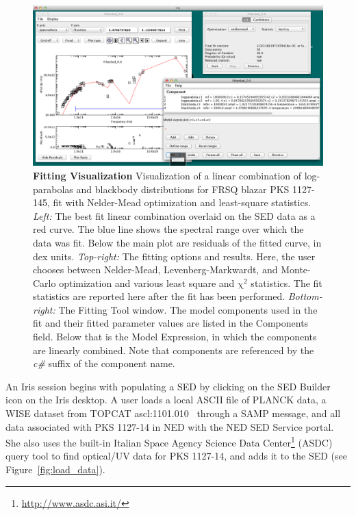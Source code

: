 \documentclass[final,5p,authoryear]{elsarticle}
\begin{document}
\begin{figure} \centering
\includegraphics[height=0.3\textheight]{figures/fitting-1.png}
\caption{\textbf{Fitting Visualization} Visualization of a linear combination of
log-parabolas and blackbody distributions for FRSQ blazar PKS 1127-145, fit with
Nelder-Mead optimization and least-square statistics. \textit{Left:} The best fit
linear combination overlaid on the SED data as a red curve. The blue line shows
the spectral range over which the data was fit. Below the main plot are
residuals of the fitted curve, in dex units. \textit{Top-right:} The fitting
options and results. Here, the user chooses between Nelder-Mead,
Levenberg-Markwardt, and Monte-Carlo \citep[Differential Evolution, ][]{Storn:1997:DEN:596061.596146}
optimization and various least square and
$\mathrm{\chi}^{2}$ statistics. The fit statistics are reported here after the
fit has been performed. \textit{Bottom-right:} The Fitting Tool window. The
model components used in the fit and their fitted parameter values are listed in
the Components field. Below that is the Model Expression, in which the
components are linearly combined. Note that components are referenced by the
\textit{c\#} suffix of the component name.} \label{fig:fitting1} \end{figure}

An Iris session begins with populating a SED by clicking on the SED Builder icon on the
Iris desktop. A user loads a local ASCII file of
PLANCK data, a WISE dataset from TOPCAT ascl:1101.010~\citep{2005ASPC..347...29T} 
through a SAMP message, and all data associated with PKS 1127-14 in NED with the NED SED
Service portal. She also uses the built-in Italian Space Agency Science Data
Center\footnote{\url{http://www.asdc.asi.it/}} (ASDC) query tool to find
optical/UV data for PKS 1127-14, and adds it to the SED (see
Figure~\ref{fig:load_data}).
\end{document}

